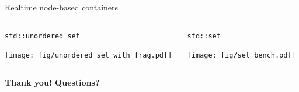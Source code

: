 \documentclass[10pt,aspectratio=169]{beamer}
\begin{document}
\begin{frame}{Realtime node-based containers}
    \begin{columns}
        \begin{column}{0.5\textwidth}
            \texttt{std::unordered\_set}
            \begin{center}
                \texttt{[image: fig/unordered\_set\_with\_frag.pdf]} \\
            \end{center}
        \end{column}

        \begin{column}{0.5\textwidth}
            \texttt{std::set}
            \begin{center}
                \texttt{[image: fig/set\_bench.pdf]} \\
            \end{center}
        \end{column}
    \end{columns}
\end{frame}

\begin{frame}{}
    \vspace{1cm}
    \begin{center}
        {\Large \bf Thank you! Questions?} 
    \end{center}
\end{frame}
\end{document}
